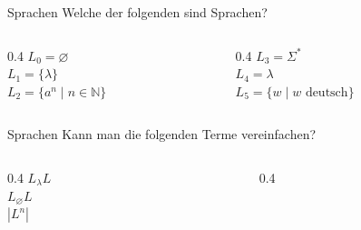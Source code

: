 \documentclass[11pt,aspectratio=169]{beamer}
\begin{document}
\begin{frame}{Sprachen}
    Welche der folgenden sind Sprachen?

    \vspace{2em}

    \begin{columns}
        \begin{column}{0.4\textwidth}
            \(L_0 = \varnothing\) \\
            \vspace{1em}
            \(L_1 = \{\lambda\}\) \\
            \vspace{1em}
            \(L_2 = \{a^n \mid n \in \mathbb N\}\)
        \end{column}
        \begin{column}{0.4\textwidth}
            \(L_3 = \Sigma^*\) \\
            \vspace{1em}
            \(L_4 = \lambda\) \\
            \vspace{1em}
            \(L_5 = \{w \mid w \text{ deutsch}\}\)
        \end{column}
    \end{columns}
\end{frame}

\begin{frame}{Sprachen}
    Kann man die folgenden Terme vereinfachen?

    \vspace{2em}

    \begin{columns}
        \begin{column}{0.4\textwidth}
            \(L_{\lambda} L\) \\
            \vspace{1em}
            \(L_{\varnothing} L\) \\
            \vspace{1em}
            \(|L^n|\)
        \end{column}
        \begin{column}{0.4\textwidth}
        \end{column}
    \end{columns}
\end{frame}
\end{document}
